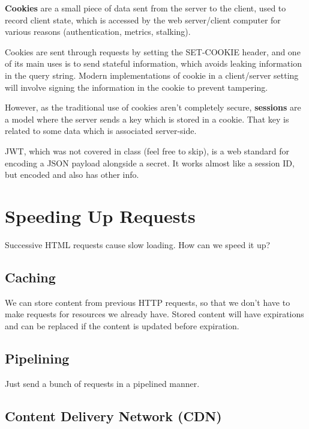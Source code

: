 \documentclass{report}
\newcommand{\npar}{\par\noindent}
\newcommand{\vpar}{\vspace{1em}\npar}
\begin{document}
\par \textbf{Cookies} are a small piece of data sent from the server to the client, used to record client state, which is accessed by the web server/client computer for various reasons (authentication, metrics, stalking).

\vpar Cookies are sent through requests by setting the SET-COOKIE header, and one of its main uses is to send stateful information, which avoids leaking information in the query string. Modern implementations of cookie in a client/server setting will involve signing the information in the cookie to prevent tampering.

\vpar However, as the traditional use of cookies aren't completely secure, \textbf{sessions} are a model where the server sends a key which is stored in a cookie. That key is related to some data which is associated server-side.

\vpar JWT, which was not covered in class (feel free to skip), is a web standard for encoding a JSON payload alongside a secret. It works almost like a session ID, but encoded and also has other info.

\section{Speeding Up Requests}

\par Successive HTML requests cause slow loading. How can we speed it up?

\subsection{Caching}

\par We can store content from previous HTTP requests, so that we don't have to make requests for resources we already have. Stored content will have expirations and can be replaced if the content is updated before expiration.

\subsection{Pipelining}

\par Just send a bunch of requests in a pipelined manner.

\subsection{Content Delivery Network (CDN)}
\end{document}
